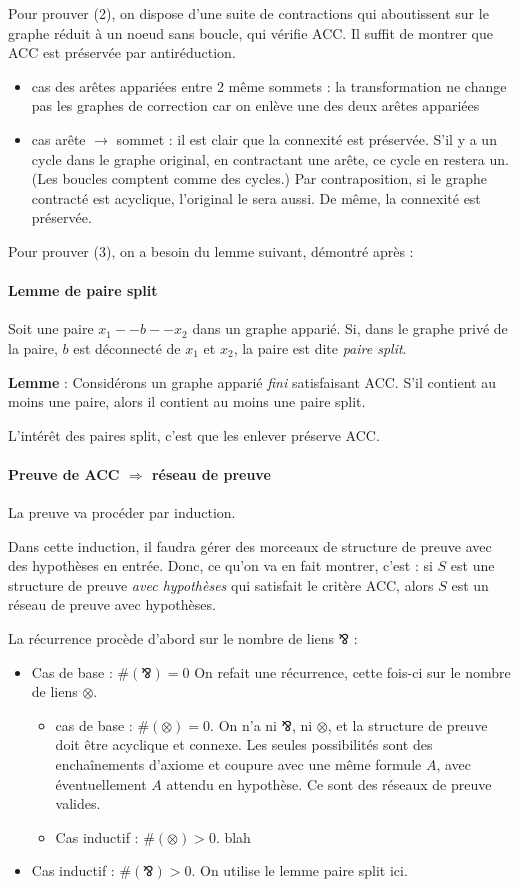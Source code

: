 \documentclass[a4paper, 11pt]{article}
\newcommand{\parr}{\mathbin{⅋}}
\begin{document}
Pour prouver (2), on dispose d'une suite de contractions qui aboutissent sur le graphe réduit à un noeud sans boucle, qui vérifie ACC. Il suffit de montrer que ACC est préservée par antiréduction.
\begin{itemize}
\item cas des arêtes appariées entre 2 même sommets : la transformation ne change pas les graphes de correction car on enlève une des deux arêtes appariées
\item cas arête $\to$ sommet : il est clair que la connexité est préservée. S'il y a un cycle dans le graphe original, en contractant une arête, ce cycle en restera un. (Les boucles comptent comme des cycles.) Par contraposition, si le graphe contracté est acyclique, l'original le sera aussi. De même, la connexité est préservée.
\end{itemize}

Pour prouver (3), on a besoin du lemme suivant, démontré après :

\paragraph{Lemme de paire split} Soit une paire $x_1 -- b -- x_2$ dans un graphe apparié. Si, dans le graphe privé de la paire, $b$ est déconnecté de $x_1$ et $x_2$, la paire est dite \emph{paire split}.

\textbf{Lemme} : Considérons un graphe apparié \emph{fini} satisfaisant ACC. S'il contient au moins une paire, alors il contient au moins une paire split.

L'intérêt des paires split, c'est que les enlever préserve ACC.

\paragraph{Preuve de ACC $\Rightarrow$ réseau de preuve} La preuve va procéder par induction.

Dans cette induction, il faudra gérer des morceaux de structure de preuve avec des hypothèses en entrée. Donc, ce qu'on va en fait montrer, c'est : si $S$ est une structure de preuve \emph{avec hypothèses} qui satisfait le critère ACC, alors $S$ est un réseau de preuve avec hypothèses.

La récurrence procède d'abord sur le nombre de liens $\parr$ :
\begin{itemize}
\item Cas de base : $\#(\parr) = 0$
  On refait une récurrence, cette fois-ci sur le nombre de liens $\otimes$.
  \begin{itemize}
  \item cas de base : $\#(\otimes) = 0$. On n'a ni $\parr$, ni $\otimes$, et la structure de preuve doit être acyclique et connexe. Les seules possibilités sont des enchaînements d'axiome et coupure avec une même formule $A$, avec éventuellement $A$ attendu en hypothèse. Ce sont des réseaux de preuve valides.
  \item Cas inductif : $\#(\otimes) > 0$. blah
  \end{itemize}
\item Cas inductif : $\#(\parr) > 0$. On utilise le lemme paire split ici.
\end{itemize}
\end{document}

